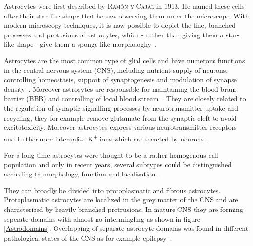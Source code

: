 \documentclass[a4paper,11pt,bibtotocnumbered]{article}
\begin{document}
Astrocytes were first described by \textsc{Ramón y Cajal} in 1913. He named these cells after their star-like shape that he saw observing them unter the microscope. With modern microscopy techniques, it is now possible to depict the fine, branched processes and protusions of astrocytes, which - rather than giving them a star-like shape - give them a sponge-like morphologhy~\cite{Cajal1913}. 




Astrocytes are the most common type of glial cells and have numerous functions in the central nervous system (CNS), including nutrient supply of neurons, controlling homeostasis, support of synaptogenesis and modulation of synapse density~\cite{Sofroniew2010}. Moreover astrocytes are responsible for maintaining the blood brain barrier (BBB) and controlling of local blood stream~\cite{Schiweck2018}. They are closely related to the regulation of synaptic signalling processes by neurotransmitter uptake and recycling, they for example remove glutamate from the synaptic cleft to avoid excitotoxicity. Moreover astrocytes express various neurotransmitter receptors~\cite{Schiweck2018, Colangelo2012} and furthermore internalise K\textsuperscript{+}-ions which are secreted by neurons~\cite{Kandel2013}.


 
 
For a long time astrocytes were thought to be a rather homogenous cell population and only in recent years, several subtypes could be distinguished according to morphology, function and localisation~\cite{Matyash2010}.

They can broadly be divided into protoplasmatic and fibrous astrocytes. Protoplasmatic astrocytes are localized in the grey matter of the CNS and are characterized by heavily branched protrusions.
In mature CNS they are forming seperate domains with almost no intermingling as shown in figure \ref{Astrodomains}. Overlapping of separate astrocyte domains was found in different pathological states of the CNS as for example epilepsy~\cite{Pekny2014}.



\end{document}
